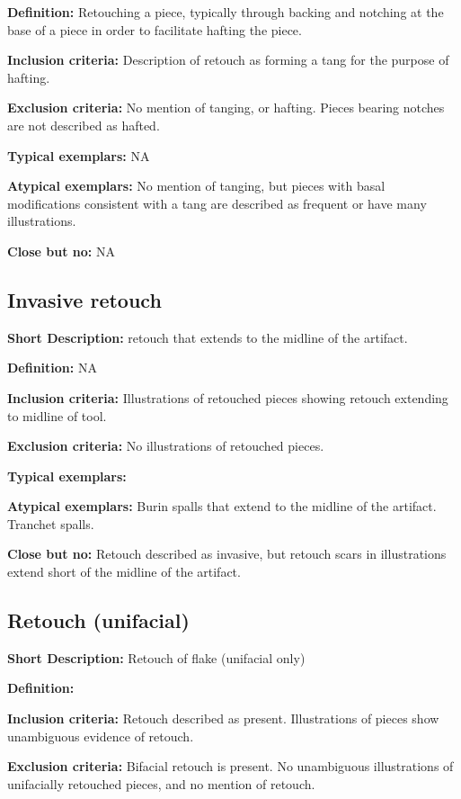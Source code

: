 \documentclass[
]{article}
\begin{document}
\textbf{Definition:} Retouching a piece, typically through backing and
notching at the base of a piece in order to facilitate hafting the
piece.

\textbf{Inclusion criteria:} Description of retouch as forming a tang
for the purpose of hafting.

\textbf{Exclusion criteria:} No mention of tanging, or hafting. Pieces
bearing notches are not described as hafted.

\textbf{Typical exemplars:} NA

\textbf{Atypical exemplars:} No mention of tanging, but pieces with
basal modifications consistent with a tang are described as frequent or
have many illustrations.

\textbf{Close but no:} NA

\hypertarget{invasive-retouch}{%
\subsection{Invasive retouch}\label{invasive-retouch}}

\textbf{Short Description:} retouch that extends to the midline of the
artifact.

\textbf{Definition:} NA

\textbf{Inclusion criteria:} Illustrations of retouched pieces showing
retouch extending to midline of tool.

\textbf{Exclusion criteria:} No illustrations of retouched pieces.

\textbf{Typical exemplars:}

\textbf{Atypical exemplars:} Burin spalls that extend to the midline of
the artifact. Tranchet spalls.

\textbf{Close but no:} Retouch described as invasive, but retouch scars
in illustrations extend short of the midline of the artifact.

\hypertarget{retouch-unifacial}{%
\subsection{Retouch (unifacial)}\label{retouch-unifacial}}

\textbf{Short Description:} Retouch of flake (unifacial only)

\textbf{Definition:}

\textbf{Inclusion criteria:} Retouch described as present. Illustrations
of pieces show unambiguous evidence of retouch.

\textbf{Exclusion criteria:} Bifacial retouch is present. No unambiguous
illustrations of unifacially retouched pieces, and no mention of
retouch.
\end{document}
